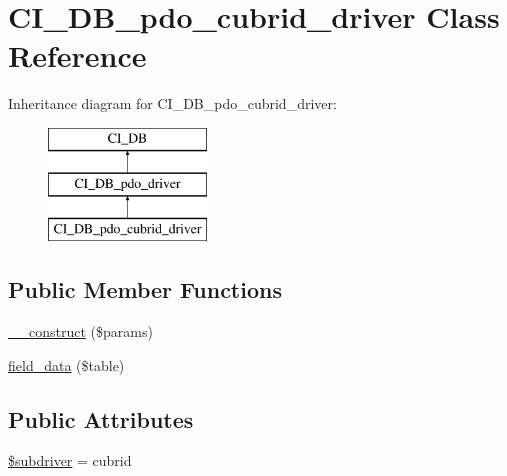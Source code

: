 \hypertarget{class_c_i___d_b__pdo__cubrid__driver}{}\section{C\+I\+\_\+\+D\+B\+\_\+pdo\+\_\+cubrid\+\_\+driver Class Reference}
\label{class_c_i___d_b__pdo__cubrid__driver}
Inheritance diagram for C\+I\+\_\+\+D\+B\+\_\+pdo\+\_\+cubrid\+\_\+driver\+:\begin{figure}[H]
\begin{center}
\leavevmode
\includegraphics[height=3.000000cm]{class_c_i___d_b__pdo__cubrid__driver}
\end{center}
\end{figure}
\subsection*{Public Member Functions}
\begin{DoxyCompactItemize}
\item 
\mbox{\hyperlink{class_c_i___d_b__pdo__cubrid__driver_a9162320adff1a1a4afd7f2372f753a3e}{\+\_\+\+\_\+construct}} (\$params)
\item 
\mbox{\hyperlink{class_c_i___d_b__pdo__cubrid__driver_a90355121e1ed009e0efdbd544ab56efa}{field\+\_\+data}} (\$table)
\end{DoxyCompactItemize}
\subsection*{Public Attributes}
\begin{DoxyCompactItemize}
\item 
\mbox{\hyperlink{class_c_i___d_b__pdo__cubrid__driver_a1322ca756348b11d080cb7a4f590de15}{\$subdriver}} = \textquotesingle{}cubrid\textquotesingle{}
\end{DoxyCompactItemize}
